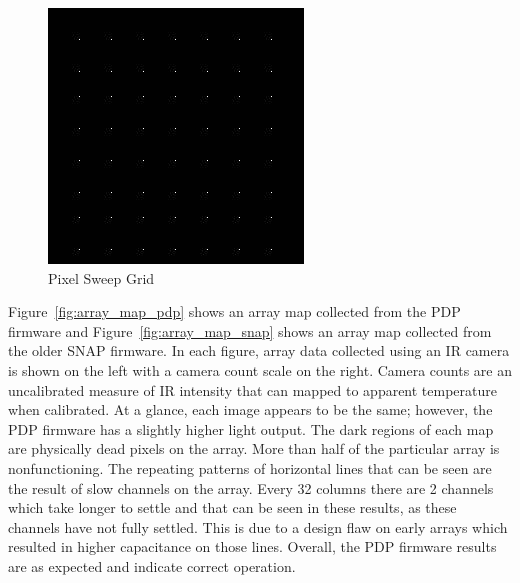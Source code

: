             \begin{figure}[t]
                \centering
                \includegraphics{fig/grid.jpg}
                \caption{Pixel Sweep Grid}
                \label{fig:grid_sweep}
            \end{figure}

            Figure~\ref{fig:array_map_pdp} shows an array map collected from the PDP firmware and Figure~\ref{fig:array_map_snap} shows an array map collected from the older SNAP firmware. In each figure, array data collected using an IR camera is shown on the left with a camera count scale on the right. Camera counts are an uncalibrated measure of IR intensity that can mapped to apparent temperature when calibrated. At a glance, each image appears to be the same; however, the PDP firmware has a slightly higher light output. The dark regions of each map are physically dead pixels on the array. More than half of the particular array is nonfunctioning. The repeating patterns of horizontal lines that can be seen are the result of slow channels on the array. Every 32 columns there are 2 channels which take longer to settle and that can be seen in these results, as these channels have not fully settled. This is due to a design flaw on early arrays which resulted in higher capacitance on those lines. Overall, the PDP firmware results are as expected and indicate correct operation.

